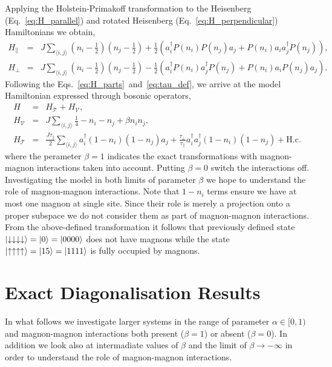 \documentclass[12pt, a4paper]{article}
\newcommand{\mean}[1]{\langle#1\rangle}
\begin{document}
Applying the Holstein-Primakoff transformation to the Heisenberg (Eq.~\ref{eq:H_parallel}) and rotated Heisenberg (Eq.~\ref{eq:H_perpendicular}) Hamiltonians we obtain,
\begin{eqnarray}
	H_{\parallel} &=& J\sum_{\mean{i,j}} \left(n_i - \frac{1}{2}\right) \left(n_j - \frac{1}{2}\right) + \frac{1}{2}\left(a_i^\dagger P(n_i) P(n_j) a_j + P(n_i) a_i a_j^\dagger P(n_j)\right), \\
	H_{\perp} &=& J\sum_{\mean{i,j}} \left(n_i - \frac{1}{2}\right) \left(n_j - \frac{1}{2}\right) - \frac{1}{2}\left(a_i^\dagger P(n_i) a_j^\dagger P(n_j) + P(n_i) a_i P(n_j) a_j\right).
\end{eqnarray}
Following the Eqs.~\ref{eq:H_parts}~and~\ref{eq:tau_def}, we arrive at the model Hamiltonian expressed through bosonic operators,
\begin{eqnarray}\label{eq:H_bosonic}
	H &=& H_{\mathcal{T}} + H_{\mathcal{V}}, \\
	H_{\mathcal{V}} &=& J\sum_{\mean{i,j}} \frac{1}{4} - n_i - n_j + \beta n_i n_j, \\
	H_{\mathcal{T}} &=& \frac{J\tau_{\parallel}}{2} \sum_{\mean{i,j}} a_i^\dagger (1-n_i)(1-n_j)a_j + \frac{\tau_{\perp}}{\tau_{\parallel}} a_i^\dagger a_j^\dagger (1-n_i) (1-n_j) + \text{H.c.}
\end{eqnarray}
where the perameter $\beta = 1$ indicates the exact transformations with magnon-magnon interactions taken into account. Putting $\beta = 0$ switch the interactions off. Investigating the model in both limits of parameter $\beta$ we hope to understand the role of magnon-magnon interactions. Note that $1-n_i$ terms ensure we have at most one magnon at single site. Since their role is merely a projection onto a proper subspace we do not consider them as part of magnon-magnon interactions. From the above-defined transformation it follows that previously defined state $\ket{\downarrow\downarrow\downarrow\downarrow} = \ket{0} = \ket{0 0 0 0}$ does not have magnons while the state $\ket{\uparrow\uparrow\uparrow\uparrow} = \ket{15} = \ket{1 1 1 1}$ is fully occupied by magnons.

\section{Exact Diagonalisation Results}\label{sec:ed_results}
In what follows we investigate larger systems in the range of parameter $\alpha \in [0, 1)$ and magnon-magnon interactions both present ($\beta = 1$) or absent ($\beta = 0$). In addition we look also at intermadiate values of $\beta$ and the limit of $\beta \to -\infty$ in order to understand the role of magnon-magnon interactions.
\end{document}
